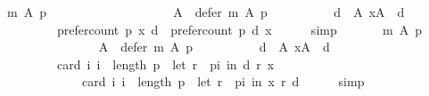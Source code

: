 \begin{isabellebody}
\isanewline
\ \ \ \ {\isachardoublequoteopen}m\ A\ p\ {\isacharequal}{\kern0pt}\isanewline
\ \ \ \ \ \ \ \ {\isacharparenleft}{\kern0pt}{\isacharbraceleft}{\kern0pt}{\isacharbraceright}{\kern0pt}{\isacharcomma}{\kern0pt}\isanewline
\ \ \ \ \ \ \ \ \ \ A\ {\isacharminus}{\kern0pt}\ defer\ m\ A\ p{\isacharcomma}{\kern0pt}\isanewline
\ \ \ \ \ \ \ \ \ \ {\isacharbraceleft}{\kern0pt}d\ {\isasymin}\ A{\isachardot}{\kern0pt}\ {\isasymforall}x{\isasymin}A\ {\isacharminus}{\kern0pt}\ {\isacharbraceleft}{\kern0pt}d{\isacharbraceright}{\kern0pt}{\isachardot}{\kern0pt}\isanewline
\ \ \ \ \ \ \ \ \ \ \ \ prefer{\isacharunderscore}{\kern0pt}count\ p\ x\ d\ {\isacharless}{\kern0pt}\ prefer{\isacharunderscore}{\kern0pt}count\ p\ d\ x{\isacharbraceright}{\kern0pt}{\isacharparenright}{\kern0pt}{\isachardoublequoteclose}\isanewline
\ \ \ \ \isamarkupfalse%
\ simp\isanewline
\ \ \isamarkupfalse%
\isanewline
\ \ \ \ {\isachardoublequoteopen}m\ A\ p\ {\isacharequal}{\kern0pt}\isanewline
\ \ \ \ \ \ \ \ {\isacharparenleft}{\kern0pt}{\isacharbraceleft}{\kern0pt}{\isacharbraceright}{\kern0pt}{\isacharcomma}{\kern0pt}\isanewline
\ \ \ \ \ \ \ \ \ \ A\ {\isacharminus}{\kern0pt}\ defer\ m\ A\ p{\isacharcomma}{\kern0pt}\isanewline
\ \ \ \ \ \ \ \ \ \ {\isacharbraceleft}{\kern0pt}d\ {\isasymin}\ A{\isachardot}{\kern0pt}\ {\isasymforall}x{\isasymin}A\ {\isacharminus}{\kern0pt}\ {\isacharbraceleft}{\kern0pt}d{\isacharbraceright}{\kern0pt}{\isachardot}{\kern0pt}\isanewline
\ \ \ \ \ \ \ \ \ \ \ \ card\ {\isacharbraceleft}{\kern0pt}i{\isachardot}{\kern0pt}\ i\ {\isacharless}{\kern0pt}\ length\ p\ {\isasymand}\ {\isacharparenleft}{\kern0pt}let\ r\ {\isacharequal}{\kern0pt}\ {\isacharparenleft}{\kern0pt}p{\isacharbang}{\kern0pt}i{\isacharparenright}{\kern0pt}\ in\ {\isacharparenleft}{\kern0pt}d\ {\isasympreceq}\isactrlsub r\ x{\isacharparenright}{\kern0pt}{\isacharparenright}{\kern0pt}{\isacharbraceright}{\kern0pt}\ {\isacharless}{\kern0pt}\isanewline
\ \ \ \ \ \ \ \ \ \ \ \ \ \ \ \ card\ {\isacharbraceleft}{\kern0pt}i{\isachardot}{\kern0pt}\ i\ {\isacharless}{\kern0pt}\ length\ p\ {\isasymand}\ {\isacharparenleft}{\kern0pt}let\ r\ {\isacharequal}{\kern0pt}\ {\isacharparenleft}{\kern0pt}p{\isacharbang}{\kern0pt}i{\isacharparenright}{\kern0pt}\ in\ {\isacharparenleft}{\kern0pt}x\ {\isasympreceq}\isactrlsub r\ d{\isacharparenright}{\kern0pt}{\isacharparenright}{\kern0pt}{\isacharbraceright}{\kern0pt}{\isacharbraceright}{\kern0pt}{\isacharparenright}{\kern0pt}{\isachardoublequoteclose}\isanewline
\ \ \ \ \isamarkupfalse%
\ simp\isanewline
\ \ \isamarkupfalse%

\end{isabellebody}
